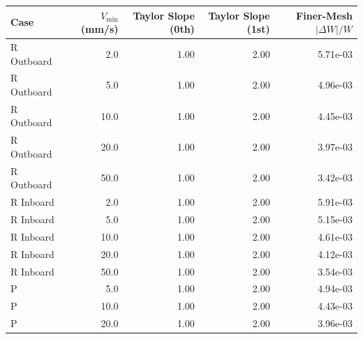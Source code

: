 \begin{tabular}{lrrrr}
\toprule
Case & $V_\mathrm{min}$ (mm/s) & Taylor Slope (0th) & Taylor Slope (1st) & Finer-Mesh $|\Delta W|/W$ \\
\midrule
R Outboard & 2.0 & 1.00 & 2.00 & 5.71e-03 \\
R Outboard & 5.0 & 1.00 & 2.00 & 4.96e-03 \\
R Outboard & 10.0 & 1.00 & 2.00 & 4.45e-03 \\
R Outboard & 20.0 & 1.00 & 2.00 & 3.97e-03 \\
R Outboard & 50.0 & 1.00 & 2.00 & 3.42e-03 \\
R Inboard & 2.0 & 1.00 & 2.00 & 5.91e-03 \\
R Inboard & 5.0 & 1.00 & 2.00 & 5.15e-03 \\
R Inboard & 10.0 & 1.00 & 2.00 & 4.61e-03 \\
R Inboard & 20.0 & 1.00 & 2.00 & 4.12e-03 \\
R Inboard & 50.0 & 1.00 & 2.00 & 3.54e-03 \\
P & 5.0 & 1.00 & 2.00 & 4.94e-03 \\
P & 10.0 & 1.00 & 2.00 & 4.43e-03 \\
P & 20.0 & 1.00 & 2.00 & 3.96e-03 \\
\bottomrule
\end{tabular}
